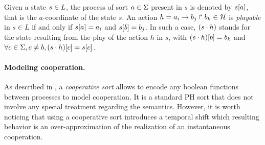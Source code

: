 \noindent
Given a state $s\in L$, the process of sort $a\in\Sigma$ present in $s$ is denoted by ${s[a]}$, that is the $a$-coordinate of the state $s$.
An action $h=a_i\rightarrow b_j\Rsh b_k \in \mathcal{H}$ is \emph{playable} in $s \in L$ if and only if ${s[a]}=a_i$ and ${s[b]} = b_j$.
In such a case, $(s\cdot h)$ stands for the state resulting from the play of the action $h$ in $s$, with
${(s\cdot h)[b]} = b_k$ and $\forall c \in \Sigma, c \neq b, {(s\cdot h)[c]} = {s[c]}$.

\paragraph{Modeling cooperation.}
As described in \cite{PMR10-TCSB}, a \emph{cooperative sort} allows to encode any boolean functions between processes to model cooperation.
It is a standard PH sort that does not involve any special treatment regarding the semantics.
However, it is worth noticing that using a cooperative sort introduces a temporal shift %
which resulting behavior is an over-approximation of the realization of an instantaneous cooperation.

\begin{comment}
As described in \cite{PMR10-TCSB}, cooperation between processes to make another process bounce can be
expressed in PH by building a \emph{cooperative sort}. This allows to encode any boolean functions
between cooperating processes using standard PH sorts that do not involve any
special treatment regarding the semantics of related actions.
However, it is worth noticing they introduce a temporal shift in their application
by allowing the existence of interleaving of actions leading to a cooperative sort representing a
past sub-state of the presence of the cooperative processes.
The resulting behavior is then an over-approximation of the realization of an instantaneous
cooperation.
\end{comment}

